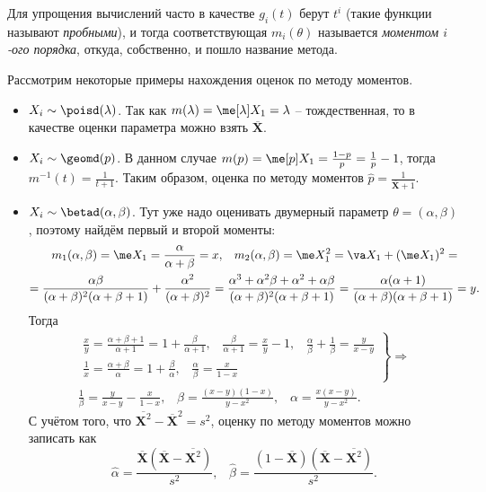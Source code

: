 Для упрощения вычислений часто в качестве $g_i(t)$ берут $t^i$ (такие функции называют \textit{пробными}), и тогда соответствующая $m_i(\theta)$ называется \textit{моментом $i$-ого порядка}, откуда, собственно, и пошло название метода.

\begin{example}\label{moment_examples}
    Рассмотрим некоторые примеры нахождения оценок по методу моментов.

    \begin{itemize}
        \item $X_i \sim \poisd(\lambda)$. Так как $m(\lambda) = \me[\lambda] X_1 = \lambda$ -- тождественная, то в качестве оценки параметра можно взять $\overline{\mathbf X}$.

        \item $X_i \sim \geomd(p)$. В данном случае $m(p) = \me[p] X_1 = \frac{1-p}{p} = \frac{1}{p} - 1$, тогда $m^{-1}(t) = \frac{1}{t+1}$. Таким образом, оценка по методу моментов $\widehat{p} = \frac{1}{\overline{\mathbf X}+1}$.

        \item $X_i \sim \betad(\alpha, \beta)$. Тут уже надо оценивать двумерный параметр $\theta = (\alpha, \beta)$, поэтому найдём первый и второй моменты:
        \begin{gather*}
        	m_1(\alpha, \beta) = \me X_1 = \frac{\alpha}{\alpha + \beta} = x, \;\;\; m_2(\alpha, \beta) = \me X_1^2 = \va X_1 + (\me X_1)^2 = \\
        	= \frac{\alpha\beta}{(\alpha + \beta)^2(\alpha + \beta + 1)} + \frac{\alpha^2}{(\alpha + \beta)^2} = \frac{\alpha^3+\alpha^2\beta+\alpha^2+\alpha\beta}{(\alpha + \beta)^2(\alpha + \beta + 1)} = \frac{\alpha(\alpha+1)}{(\alpha + \beta)(\alpha + \beta + 1)} = y.
        \end{gather*}
        Тогда
    \begin{gather*}
    \left.
    \begin{aligned}
    \frac{x}{y} = \frac{\alpha + \beta + 1}{\alpha + 1} = 1 + \frac{\beta}{\alpha + 1},\;\;\;\frac{\beta}{\alpha+1} = \frac{x}{y} - 1 ,\;\;\;\frac{\alpha}{\beta} + \frac{1}{\beta}= \frac{y}{x - y}\\
    \frac{1}{x} = \frac{\alpha + \beta}{\alpha} = 1 + \frac{\beta}{\alpha},\;\;\; \frac{\alpha}{\beta} = \frac{x}{1 - x}
    \end{aligned}
    \right\} \Longrightarrow \\
    \frac{1}{\beta} = \frac{y}{x-y} - \frac{x}{1-x},\;\;\;
    \beta = \frac{(x-y)(1-x)}{y-x^2} ,\;\;\;\alpha = \frac{x(x-y)}{y-x^2}.
    \end{gather*}
    С учётом того, что $\overline{\mathbf X^2} - \overline{\mathbf X}^2=s^2$, оценку по методу моментов можно записать как
    \[
    \widehat{\alpha} = \frac{\overline{\mathbf X}(\overline{\mathbf X} - \overline{\mathbf X^2})}{s^2},\;\;\;\widehat{\beta} = \frac{(1 - \overline{\mathbf X})(\overline{\mathbf X} - \overline{\mathbf X^2})}{s^2}.
    \]


\end{itemize}
\end{example}
